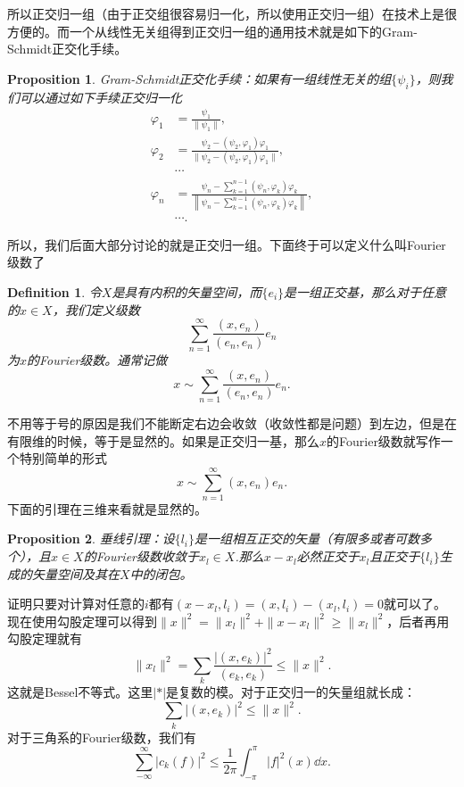 \documentclass[10pt]{book}
\theoremstyle{plain}%
\newtheorem{pro}{Proposition}[chapter]%
\newtheorem{defi}{Definition}[chapter]%
\begin{document}
所以正交归一组（由于正交组很容易归一化，所以使用正交归一组）在技术上是很方便的。而一个从线性无关组得到正交归一组的通用技术就是如下的Gram-Schmidt正交化手续。
\begin{pro}
Gram-Schmidt正交化手续：如果有一组线性无关的组$\{\psi_i\}$，则我们可以通过如下手续正交归一化
\[
	\begin{split}
		\varphi_1&=\frac{\psi_1}{\|\psi_1\|},\\
		\varphi_2&=\frac{\psi_2-(\psi_2,\varphi_1)\varphi_1}{\|\psi_2-(\psi_2,\varphi_1)\varphi_1\|},\\
		&\cdots\\
		\varphi_n&=\frac{\psi_n-\sum_{k=1}^{n-1}(\psi_n,\varphi_k)\varphi_k}{\left\|\psi_n-\sum_{k=1}^{n-1}(\psi_n,\varphi_k)\varphi_k\right\|},\\
		&\cdots.
	\end{split}
\]
\end{pro}
所以，我们后面大部分讨论的就是正交归一组。下面终于可以定义什么叫Fourier级数了
\begin{defi}
令$X$是具有内积的矢量空间，而$\{e_i\}$是一组正交基，那么对于任意的$x\in X$，我们定义级数
\[
	\sum_{n=1}^\infty \frac{(x,e_n)}{(e_n,e_n)}e_n
\]
为$x$的Fourier级数。通常记做
\[
	x\sim \sum_{n=1}^\infty \frac{(x,e_n)}{(e_n,e_n)}e_n.
\]
\end{defi}
不用等于号的原因是我们不能断定右边会收敛（收敛性都是问题）到左边，但是在有限维的时候，等于是显然的。如果是正交归一基，那么$x$的Fourier级数就写作一个特别简单的形式
\[
	x\sim \sum_{n=1}^\infty (x,e_n)e_n.
\]
下面的引理在三维来看就是显然的。
\begin{pro}
垂线引理：设$\{l_i\}$是一组相互正交的矢量（有限多或者可数多个），且$x\in X$的Fourier级数收敛于$x_l\in X$.那么$x-x_l$必然正交于$x_l$且正交于$\{l_i\}$生成的矢量空间及其在$X$中的闭包。
\end{pro}
证明只要对计算对任意的$i$都有$(x-x_l,l_i)=(x,l_i)-(x_l,l_i)=0$就可以了。现在使用勾股定理可以得到$\|x\|^2=\|x_l\|^2+\|x-x_l\|^2\geq \|x_l\|^2$，后者再用勾股定理就有
\[
	\|x_l\|^2=\sum_k \frac{|(x,e_k)|^2}{(e_k,e_k)}\leq \|x\|^2. 
\]
这就是Bessel不等式。这里$|*|$是复数的模。对于正交归一的矢量组就长成：
\[
	\sum_k |(x,e_k)|^2\leq \|x\|^2. 
\]
对于三角系的Fourier级数，我们有
\[
	\sum_{-\infty}^\infty |c_k(f)|^2\leq \frac{1}{2\pi}\int_{-\pi}^\pi |f|^2(x) \dd x.
\]
\end{document}
